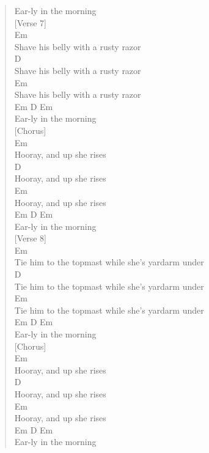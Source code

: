 \documentclass[11pt]{article}
\begin{document}
\begin{verse}
Ear-ly in the morning\\
\vspace*{1em}
\vspace*{1em}
[Verse 7]\\
Em\\
Shave his belly with a rusty razor\\
D\\
Shave his belly with a rusty razor\\
Em\\
Shave his belly with a rusty razor\\
Em  D         Em\\
Ear-ly in the morning\\
\vspace*{1em}
\vspace*{1em}
[Chorus]\\
Em\\
Hooray, and up she rises\\
D\\
Hooray, and up she rises\\
Em\\
Hooray, and up she rises\\
Em  D         Em\\
Ear-ly in the morning\\
\vspace*{1em}
\vspace*{1em}
[Verse 8]\\
Em\\
Tie him to the topmast while she's yardarm under\\
D\\
Tie him to the topmast while she's yardarm under\\
Em\\
Tie him to the topmast while she's yardarm under\\
Em  D         Em\\
Ear-ly in the morning\\
\vspace*{1em}
\vspace*{1em}
[Chorus]\\
Em\\
Hooray, and up she rises\\
D\\
Hooray, and up she rises\\
Em\\
Hooray, and up she rises\\
Em  D         Em\\
Ear-ly in the morning\\

\end{verse}
\end{document}
